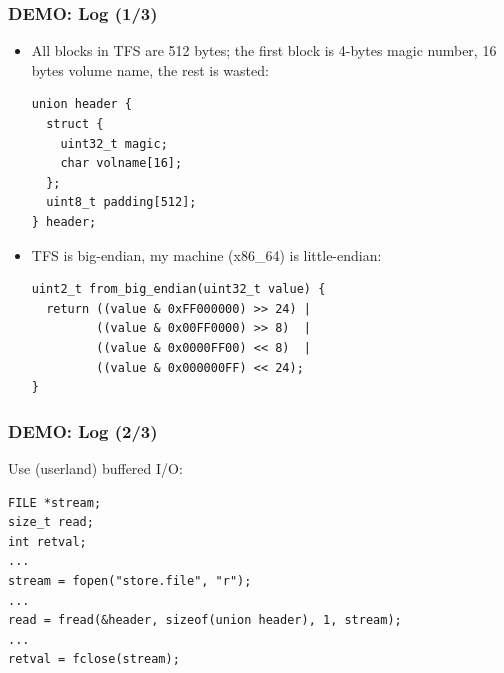 \begin{frame}[fragile]

\frametitle{DEMO: Log (1/3)}

\begin{itemize}

\item All blocks in TFS are 512 bytes; the first block is 4-bytes magic number,
16 bytes volume name, the rest is wasted:

\begin{verbatim}
union header {
  struct {
    uint32_t magic;
    char volname[16];
  };
  uint8_t padding[512];
} header;
\end{verbatim}

\item TFS is big-endian, my machine (x86\_64) is little-endian:

\begin{verbatim}
uint2_t from_big_endian(uint32_t value) {
  return ((value & 0xFF000000) >> 24) |
         ((value & 0x00FF0000) >> 8)  |
         ((value & 0x0000FF00) << 8)  |
         ((value & 0x000000FF) << 24);
}
\end{verbatim}

\end{itemize}

\end{frame}


\begin{frame}[fragile]

\frametitle{DEMO: Log (2/3)}

Use (userland) buffered I/O:

\begin{verbatim}
FILE *stream;
size_t read;
int retval;
...
stream = fopen("store.file", "r");
...
read = fread(&header, sizeof(union header), 1, stream);
...
retval = fclose(stream);
\end{verbatim}

\end{frame}


